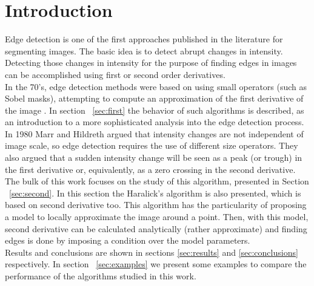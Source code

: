 \documentclass{ipol}
\numberwithin{equation}{section}
\numberwithin{table}{section}
\numberwithin{figure}{section}
\begin{document}



\section{Introduction}
\label{sec:intro}

Edge detection is one of the first approaches published in the literature for 
segmenting images. The basic idea is to detect abrupt changes in intensity. 
Detecting those changes in intensity for the purpose of finding edges in images 
can be accomplished using first or second order derivatives. \\

In the 70's, edge detection methods were based on using small operators 
(such as Sobel masks), attempting to compute an approximation of the
first derivative of the image \cite{Gonzalez2007Digital}. In section ~\ref{sec:first} the 
behavior of such algorithms is described, as an introduction to a more sophisticated 
analysis into the edge detection process.\\

In 1980 Marr and Hildreth \cite{AIM-518} argued that intensity changes are not independent 
of image scale, so edge detection requires the use of different size 
operators. They also argued that a sudden intensity change will be seen 
as a peak (or trough) in the first derivative or, equivalently, as a zero 
crossing in the second derivative. The bulk of this work focuses on the 
study of this algorithm, presented in Section ~\ref{sec:second}. In this section 
the Haralick's algorithm \cite{bb20239} is also presented, which is based on second derivative too.
This algorithm has the particularity of proposing a model to locally approximate 
the image around a point. Then, with this model, second derivative can be calculated 
analytically (rather approximate) and finding edges is done by imposing a 
condition over the model parameters. \\

Results and conclusions are shown in sections \ref{sec:results} and 
\ref{sec:conclusions} respectively. In section ~\ref{sec:examples} we present some examples to compare the 
performance of the algorithms studied in this work. \\
\end{document}
